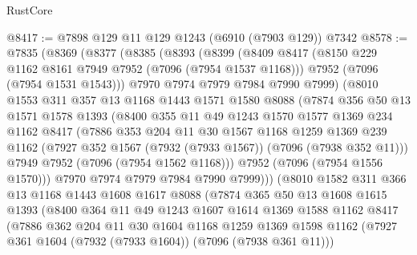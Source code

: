 \begin{lexlean}{RustCore}
\begin{coremodule}
@8417 := @7898 @129 @11 @129 @1243 (@6910 (@7903 @129)) @7342
@8578 := @7835
    (@8369
      (@8377
        (@8385
          (@8393
            (@8399
              (@8409
                @8417
                (@8150 @229 @1162 @8161 @7949 @7952 (@7096 (@7954 @1537 @1168)))
                @7952
                (@7096 (@7954 @1531 @1543)))
              @7970
              @7974
              @7979
              @7984
              @7990
              @7999)
            (@8010
              @1553
              @311
              @357
              @13
              @1168
              @1443
              @1571
              @1580
              @8088
              (@7874
                @356
                @50
                @13
                @1571
                @1578
                @1393
                (@8400
                  @355
                  @11
                  @49
                  @1243
                  @1570
                  @1577
                  @1369
                  @234
                  @1162
                  @8417
                  (@7886
                    @353
                    @204
                    @11
                    @30
                    @1567
                    @1168
                    @1259
                    @1369
                    @239
                    @1162
                    (@7927 @352 @1567 (@7932 (@7933 @1567)) (@7096 (@7938 @352 @11)))
                    @7949
                    @7952
                    (@7096 (@7954 @1562 @1168)))
                  @7952
                  (@7096 (@7954 @1556 @1570)))
                @7970
                @7974
                @7979
                @7984
                @7990
                @7999)))
          (@8010
            @1582
            @311
            @366
            @13
            @1168
            @1443
            @1608
            @1617
            @8088
            (@7874
              @365
              @50
              @13
              @1608
              @1615
              @1393
              (@8400
                @364
                @11
                @49
                @1243
                @1607
                @1614
                @1369
                @1588
                @1162
                @8417
                (@7886
                  @362
                  @204
                  @11
                  @30
                  @1604
                  @1168
                  @1259
                  @1369
                  @1598
                  @1162
                  (@7927 @361 @1604 (@7932 (@7933 @1604)) (@7096 (@7938 @361 @11)))

\end{coremodule}
\end{lexlean}
